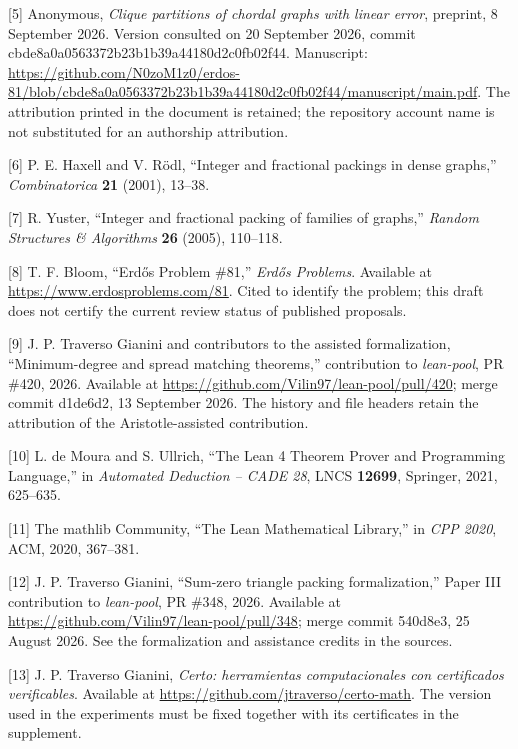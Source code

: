 \documentclass[english,11pt,a4paper]{article}
\begin{document}
{[}5{]} Anonymous, \emph{Clique partitions of chordal graphs with linear error}, preprint, 8 September 2026. Version consulted on 20 September 2026, commit {\ttfamily\small cbde8a0a0563\discretionary{\hbox{\ensuremath{\hookrightarrow}}}{}{}372b23b1b39a\discretionary{\hbox{\ensuremath{\hookrightarrow}}}{}{}44180d2c0fb0\discretionary{\hbox{\ensuremath{\hookrightarrow}}}{}{}2f44}. Manuscript: \url{https://github.com/N0zoM1z0/erdos-81/blob/cbde8a0a0563372b23b1b39a44180d2c0fb02f44/manuscript/main.pdf}. The attribution printed in the document is retained; the repository account name is not substituted for an authorship attribution.

{[}6{]} P. E. Haxell and V. Rödl, ``Integer and fractional packings in dense graphs,'' \emph{Combinatorica} \textbf{21} (2001), 13--38.

{[}7{]} R. Yuster, ``Integer and fractional packing of families of graphs,'' \emph{Random Structures \& Algorithms} \textbf{26} (2005), 110--118.

{[}8{]} T. F. Bloom, ``Erdős Problem \#81,'' \emph{Erdős Problems}. Available at \url{https://www.erdosproblems.com/81}. Cited to identify the problem; this draft does not certify the current review status of published proposals.

{[}9{]} J. P. Traverso Gianini and contributors to the assisted formalization, ``Minimum-degree and spread matching theorems,'' contribution to \emph{lean-pool}, PR \#420, 2026. Available at \url{https://github.com/Vilin97/lean-pool/pull/420}; merge commit {\ttfamily\small d1de6d2}, 13 September 2026. The history and file headers retain the attribution of the Aristotle-assisted contribution.

\clearpage
{[}10{]} L. de Moura and S. Ullrich, ``The Lean 4 Theorem Prover and Programming Language,'' in \emph{Automated Deduction -- CADE 28}, LNCS \textbf{12699}, Springer, 2021, 625--635.

{[}11{]} The mathlib Community, ``The Lean Mathematical Library,'' in \emph{CPP 2020}, ACM, 2020, 367--381.

{[}12{]} J. P. Traverso Gianini, ``Sum-zero triangle packing formalization,'' Paper III contribution to \emph{lean-pool}, PR \#348, 2026. Available at \url{https://github.com/Vilin97/lean-pool/pull/348}; merge commit {\ttfamily\small 540d8e3}, 25 August 2026. See the formalization and assistance credits in the sources.

{[}13{]} J. P. Traverso Gianini, \emph{Certo: herramientas computacionales con certificados verificables}. Available at \url{https://github.com/jtraverso/certo-math}. The version used in the experiments must be fixed together with its certificates in the supplement.
\end{document}
